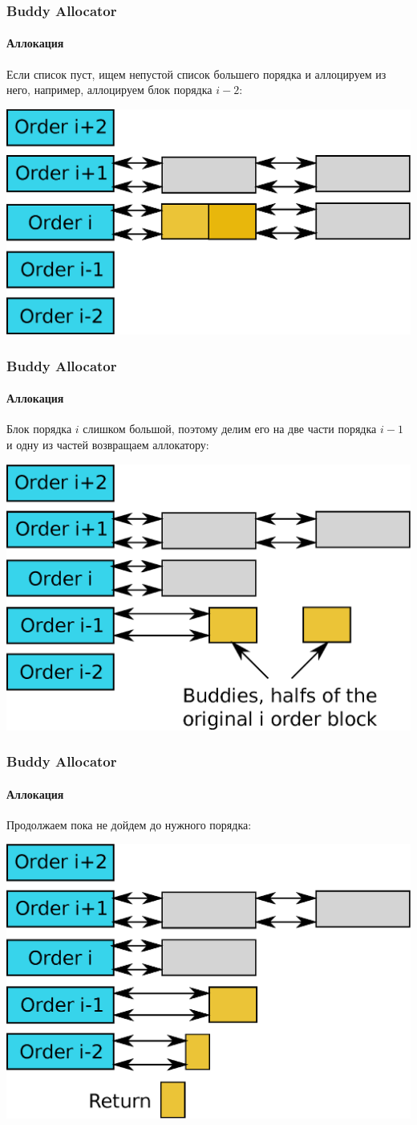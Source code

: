 \begin{frame}
\frametitle{Buddy Allocator}
\framesubtitle{Аллокация}

Если список пуст, ищем непустой список большего порядка и аллоцируем из него, например, аллоцируем блок порядка $i-2$:

\includegraphics[width=.8\linewidth]{buddy-alloc1}

\end{frame}

\begin{frame}
\frametitle{Buddy Allocator}
\framesubtitle{Аллокация}

Блок порядка $i$ слишком большой, поэтому делим его на две части порядка $i-1$ и одну из частей возвращаем аллокатору:

\includegraphics[width=.8\linewidth]{buddy-alloc2}

\end{frame}

\begin{frame}
\frametitle{Buddy Allocator}
\framesubtitle{Аллокация}

Продолжаем пока не дойдем до нужного порядка:

\includegraphics[width=.8\linewidth]{buddy-alloc3}

\end{frame}

